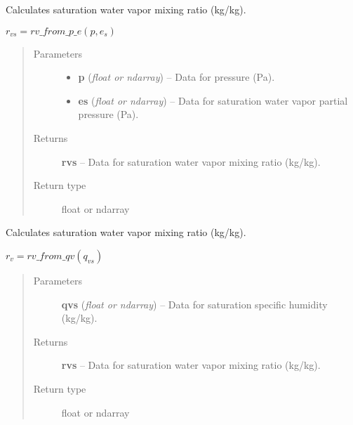 \documentclass[letterpaper,10pt,english]{sphinxmanual}
\begin{document}
\begin{fulllineitems}
\label{atmos:atmos.equations.rvs_from_p_es}
Calculates saturation water vapor mixing ratio (kg/kg).

\(r_{vs} = rv\_from\_p\_e(p, e_s)\)
\begin{quote}\begin{description}
\item[{Parameters}] \leavevmode\begin{itemize}
\item {} 
\textbf{p} (\emph{float or ndarray}) -- Data for pressure (Pa).

\item {} 
\textbf{es} (\emph{float or ndarray}) -- Data for saturation water vapor partial pressure (Pa).

\end{itemize}

\item[{Returns}] \leavevmode
\textbf{rvs} --
Data for saturation water vapor mixing ratio (kg/kg).

\item[{Return type}] \leavevmode
float or ndarray

\end{description}\end{quote}

\end{fulllineitems}


\begin{fulllineitems}
\label{atmos:atmos.equations.rvs_from_qvs}
Calculates saturation water vapor mixing ratio (kg/kg).

\(r_v = rv\_from\_qv(q_{vs})\)
\begin{quote}\begin{description}
\item[{Parameters}] \leavevmode
\textbf{qvs} (\emph{float or ndarray}) -- Data for saturation specific humidity (kg/kg).

\item[{Returns}] \leavevmode
\textbf{rvs} --
Data for saturation water vapor mixing ratio (kg/kg).

\item[{Return type}] \leavevmode
float or ndarray

\end{description}\end{quote}

\end{fulllineitems}
\end{document}
